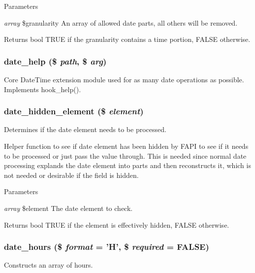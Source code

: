 \begin{DoxyParams}{Parameters}
\item[{\em array}]\$granularity An array of allowed date parts, all others will be removed.\end{DoxyParams}
\begin{DoxyReturn}{Returns}
bool TRUE if the granularity contains a time portion, FALSE otherwise. 
\end{DoxyReturn}
\hypertarget{date__api_8module_a21d6be4e94853aa99a0bf6db821ef5f8}{
\subsubsection[{date\_\-help}]{\setlength{\rightskip}{0pt plus 5cm}date\_\-help (\$ {\em path}, \/  \$ {\em arg})}}
\label{date__api_8module_a21d6be4e94853aa99a0bf6db821ef5f8}
Core DateTime extension module used for as many date operations as possible. Implements hook\_\-help(). \hypertarget{date__api_8module_adf08b59d3645c530612349f108b4a45d}{
\subsubsection[{date\_\-hidden\_\-element}]{\setlength{\rightskip}{0pt plus 5cm}date\_\-hidden\_\-element (\$ {\em element})}}
\label{date__api_8module_adf08b59d3645c530612349f108b4a45d}
Determines if the date element needs to be processed.

Helper function to see if date element has been hidden by FAPI to see if it needs to be processed or just pass the value through. This is needed since normal date processing explands the date element into parts and then reconstructs it, which is not needed or desirable if the field is hidden.


\begin{DoxyParams}{Parameters}
\item[{\em array}]\$element The date element to check.\end{DoxyParams}
\begin{DoxyReturn}{Returns}
bool TRUE if the element is effectively hidden, FALSE otherwise. 
\end{DoxyReturn}
\hypertarget{date__api_8module_a1fcb343f239750316408995fb4ed6f88}{
\subsubsection[{date\_\-hours}]{\setlength{\rightskip}{0pt plus 5cm}date\_\-hours (\$ {\em format} = {\ttfamily 'H'}, \/  \$ {\em required} = {\ttfamily FALSE})}}
\label{date__api_8module_a1fcb343f239750316408995fb4ed6f88}
Constructs an array of hours.



